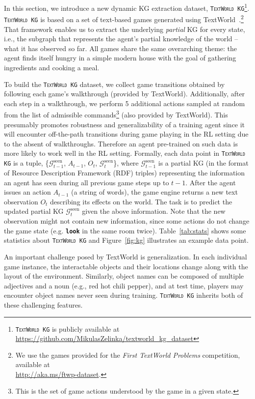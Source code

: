 \documentclass{article}
\newcommand{\code}[1]{\texttt{#1}}
\newcommand{\cmd}[1]{\textbf{\small{\code{#1}}}}
\newcommand{\twkg}{\texttt{\textsc{TextWorld KG}}\xspace}
\begin{document}
In this section, we introduce a new dynamic KG extraction dataset, \twkg \footnote{\twkg is publicly available at \url{https://github.com/MikulasZelinka/textworld_kg_dataset}}.
\twkg is based on a set of text-based games generated using TextWorld~\citep{cote18textworld}.\footnote{We use the games provided for the \emph{First TextWorld Problems} competition, available at\\ \url{http://aka.ms/ftwp-dataset}.}
That framework enables us to extract the underlying \emph{partial} KG for every state, i.e., the subgraph that represents the agent's partial knowledge of the world -- what it has observed so far. All games share the same overarching theme: the agent finds itself hungry in a simple modern house with the goal of gathering ingredients and cooking a meal.

To build the \twkg dataset, we collect game transitions obtained by following each game's walkthrough (provided by TextWorld). Additionally, after each step in a walkthrough, we perform 5 additional actions sampled at random from the list of admissible commands\footnote{This is the set of game actions understood by the game in a given state.} (also provided by TextWorld).
This presumably promotes robustness and generalizability of a training agent since it will encounter off-the-path transitions during game playing in the RL setting due to the absent of walkthroughs.
Therefore an agent pre-trained on such data is more likely to work well in the RL setting.
Formally, each data point in \twkg is a tuple, \{$\mathcal{G}^\text{seen}_{t-1}$, $A_{t-1}$, $O_t$, $\mathcal{G}^\text{seen}_{t}$\}, where $\mathcal{G}^\text{seen}_{t-1}$ is a partial KG (in the format of Resource Description Framework (RDF) triples) representing the information an agent has seen during all previous game steps up to $t-1$. After the agent issues an action $A_{t-1}$ (a string of words), the game engine returns a new text observation $O_t$ describing its effects on the world.
The task is to predict the updated partial KG $\mathcal{G}^\text{seen}_{t}$ given the above information.
Note that the new observation might not contain new information, since some actions do not change the game state (e.g. \cmd{look} in the same room twice).
Table~\ref{tab:stats} shows some statistics about \twkg and Figure~\ref{fig:kg} illustrates an example data point.

An important challenge posed by TextWorld is generalization. 
In each individual game instance, the interactable objects and their locations change along with the layout of the environment. 
Similarly, object names can be composed of multiple adjectives and a noun (e.g., red hot chili pepper), and at test time, players may encounter object names never seen during training. \twkg inherits both of these challenging features.
\end{document}
